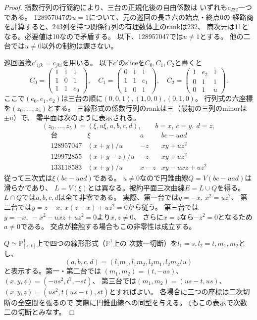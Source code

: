 \begin{proof}
指数行列の行簡約により、三台の正規化後の自由係数は
いずれも$c_{222}$一つである。
128957047の$u=1$について、元の巡回の長さ六の始点・終点0の
経路商を計算すると、243列を持つ関係行列の有理数体上のrankは232、
商次元は11となる。必要値は10なので矛盾する。
以下、128957047では$u\ne1$とする。
他の二台では$u\ne0$以外の制約は課さない。

巡回置換$c'_{ijk}=c_{jki}$を用いる。
以下$c'$のsliceを$C_0,C_1,C_2$と書くと
\[
 C_0=\begin{pmatrix}1&1&1\\1&0&1\\1&1&e_0\end{pmatrix},
 \quad C_1=\begin{pmatrix}0&1&1\\1&1&e_1\\1&0&1\end{pmatrix},
 \quad C_2=\begin{pmatrix}1&e_2&1\\0&1&1\\0&1&u\end{pmatrix}.
\]
ここで$(e_0,e_1,e_2)$は三台の順に$(0,0,1),(1,0,0),(0,1,0)$。
行列式の六座標を$(z_0,\dots,z_5)$とする。
三線形式の係数行列のrankは三（最初の三列のminorは$\pm u$）で、
零平面は次のように表示される。
\[
 (z_0,\dots,z_5)=(\xi,u\xi,a,b,c,d),
 \qquad b=x,\ c=y,\ d=z ,
\]
\[
\begin{array}{r|c|c|c}
\text{台}&\xi&a&bc-uad\\ \hline
128957047&(x+y)/u&-z&xy+uz^2\\
129972855&(x+y-z)/u&-z&xy+uz^2\\
133118583&(x+y)/u&x-z&xy-uxz+uz^2
\end{array}
\]
従って三次式は$\xi(bc-uad)$である。
$u\ne0$なので円錐曲線$Q=V(bc-uad)$は滑らかであり、
$L=V(\xi)$とは異なる。被約平面三次曲線$E=L\cup Q$を得る。
$L\cap Q$では$a,b,c,d$は全て非零である。
実際、第一台では$y=-x,\ x^2=uz^2$、
第二台では$y=z-x,\ x(z-x)+uz^2=0$から従う。
第三台では$y=-x,\ -x^2-uxz+uz^2=0$より$x,z\ne0$、
さらに$x=z$なら$-z^2=0$となるため$a\ne0$である。
交点が接触する場合もこの非零性は成立する。

$Q\simeq\mathbb P^1_{[s:t]}$上で四つの線形形式（$\mathbb P^1$上の
次数一切断）を$l_1=s,l_2=t,m_1,m_2$とし、
\[
 (a,b,c,d)=(l_1m_1,l_1m_2,l_2m_1,l_2m_2/u)
\]
と表示する。第一・第二台では
$(m_1,m_2)=(t,-us)$、$(x,y,z)=(-us^2,t^2,-st)$、
第三台では$(m_1,m_2)=(us-t,us)$、
$(x,y,z)=(us^2,t(us-t),st)$とすればよい。
各場合に三つの座標は二次切断の全空間を張るので
実際に円錐曲線への同型を与える。
$\xi$もこの表示で次数二の切断とみなす。


\end{proof}
